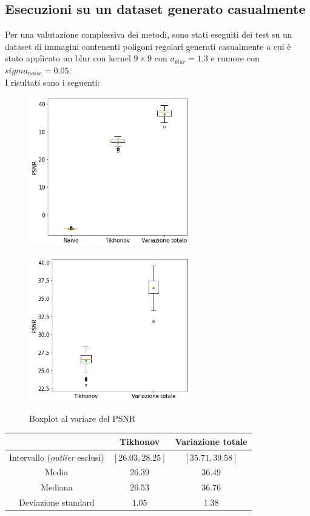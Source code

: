\documentclass[11pt]{article}
\begin{document}
\subsection{Esecuzioni su un dataset generato casualmente}
Per una valutazione complessiva dei metodi, sono stati eseguiti dei test su un dataset di immagini contenenti poligoni regolari generati casualmente 
a cui è stato applicato un blur con kernel $9 \times 9$ con $\sigma_{blur}=1.3$ e rumore con $sigma_{noise}=0.05$.\\
I risultati sono i seguenti:
\begin{figure}[H]
    \centering
    \begin{minipage}{0.45\textwidth}
        \centering
        \includegraphics[width=7cm]{esecuzioni_multiple/100/psnr1.png}
        \label{fig:100_psnr1}
    \end{minipage}\hfill
    \begin{minipage}{0.45\textwidth}
        \centering
        \includegraphics[width=7cm]{esecuzioni_multiple/100/psnr2.png}
        \label{fig:100_psnr2}
    \end{minipage}
    \caption{Boxplot al variare del PSNR}
\end{figure}
\begin{center}
    \begin{tabular}{ |c|c|c| }
    \hline
    & Tikhonov & Variazione totale \\ 
    \hline
    Intervallo (\emph{outlier} esclusi) & $[26.03, 28.25]$ & $[35.71, 39.58]$ \\
    Media & $26.39$ & $36.49$ \\
    Mediana & $26.53$ & $36.76$ \\
    Deviazione standard & $1.05$ & $1.38$ \\
    \hline
    \end{tabular}
\end{center}
\end{document}
